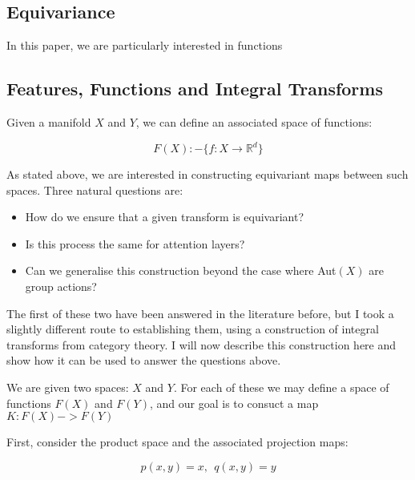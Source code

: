 \documentclass[12pt]{article}
\begin{document}
\subsection*{Equivariance}

In this paper, we are particularly interested in functions  



\subsection*{Features, Functions and Integral Transforms}

Given a manifold $X$ and $Y$, we can define an associated space of functions:

$$ F(X) :- \{ f: X \rightarrow \mathbb{R}^d \}$$

As stated above, we are interested in constructing equivariant maps between such spaces. Three natural questions are:

\begin{itemize}
    \item How do we ensure that a given transform is equivariant?
    \item Is this process the same for attention layers? 
    \item Can we generalise this construction beyond the case where Aut$(X)$ are group actions?
\end{itemize}

The first of these two have been answered in the literature before, but I took a slightly different route to establishing them, using a construction of integral transforms from category theory. I will now describe this construction here and show how it can be used to answer the questions above. %

We are given two spaces: $X$ and $Y$. For each of these we may define a space of functions $F(X)$ and $F(Y)$, and our goal is to consuct a map $K: F(X) -> F(Y)$

First, consider the product space and the associated projection maps:

$$ p(x, y) = x, \ \  q(x, y) = y$$

\pagebreak

\end{document}
